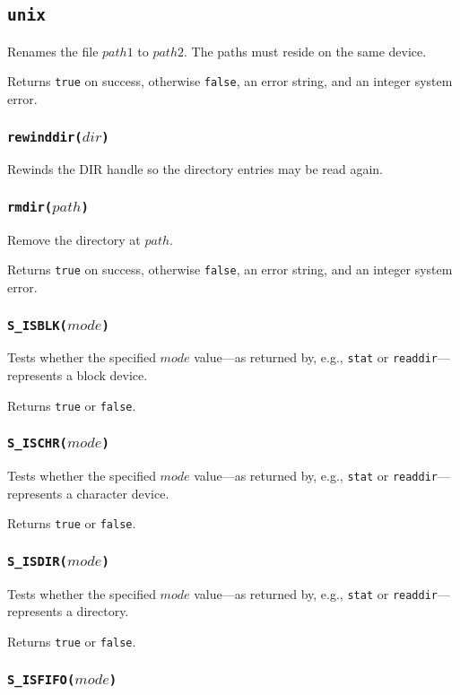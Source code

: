 \documentclass[11pt, oneside]{memoir}
\newcommand*{\true}[0]{\texttt{true}\xspace}
\newcommand*{\false}[0]{\texttt{false}\xspace}
\newcommand*{\syscall}[1]{\texttt{#1}\xspace}
\newcommand*{\fn}[1]{\texttt{#1}\xspace}
\newcounter{toccols}
\newenvironment{Module}[1]{
	\subsection{\texttt{#1}}
	\addtocontents{toc}{
		\protect\begin{multicols}{\value{toccols}}
	}
}{
	\addtocontents{toc}{\protect\end{multicols}}
}
\begin{document}
\begin{Module}{unix}
Renames the file $path1$ to $path2$. The paths must reside on the same device.

Returns \true on success, otherwise \false, an error string, and an integer system error.

\subsubsection[\fn{rewinddir}]{\fn{rewinddir($dir$)}}

Rewinds the DIR handle so the directory entries may be read again.

\subsubsection[\fn{rmdir}]{\fn{rmdir($path$)}}

Remove the directory at $path$.

Returns \true on success, otherwise \false, an error string, and an integer system error.

\subsubsection[\fn{S\_ISBLK}]{\fn{S\_ISBLK($mode$)}}

Tests whether the specified $mode$ value---as returned by, e.g., \syscall{stat} or \syscall{readdir}---represents a block device.

Returns \true or \false.

\subsubsection[\fn{S\_ISCHR}]{\fn{S\_ISCHR($mode$)}}

Tests whether the specified $mode$ value---as returned by, e.g., \syscall{stat} or \syscall{readdir}---represents a character device.

Returns \true or \false.

\subsubsection[\fn{S\_ISDIR}]{\fn{S\_ISDIR($mode$)}}

Tests whether the specified $mode$ value---as returned by, e.g., \syscall{stat} or \syscall{readdir}---represents a directory.

Returns \true or \false.

\subsubsection[\fn{S\_ISFIFO}]{\fn{S\_ISFIFO($mode$)}}


\end{Module}
\end{document}
